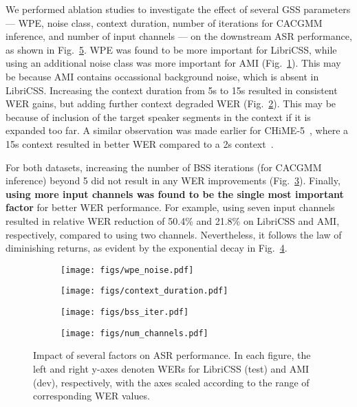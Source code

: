 \documentclass[a4paper]{article}
\begin{document}
We performed ablation studies to investigate the effect of several GSS parameters --- WPE, noise class, context duration, number of iterations for CACGMM inference, and number of input channels --- on the downstream ASR performance, as shown in Fig.~\ref{fig:analysis}. WPE was found to be more important for LibriCSS, while using an additional noise class was more important for AMI (Fig.~\ref{fig:wpe}). This may be because AMI contains occassional background noise, which is absent in LibriCSS. Increasing the context duration from 5s to 15s resulted in consistent WER gains, but adding further context degraded WER (Fig.~\ref{fig:context}). This may be because of inclusion of the target speaker segments in the context if it is expanded too far. A similar observation was made earlier for CHiME-5~\cite{Barker2015TheT}, where a 15s context resulted in better WER compared to a 2s context~\cite{Boeddeker2018FrontendPF}.

For both datasets, increasing the number of BSS iterations (for CACGMM inference) beyond 5 did not result in any WER improvements (Fig.~\ref{fig:iter}). Finally, \textbf{using more input channels was found to be the single most important factor} for better WER performance. For example, using seven input channels resulted in relative WER reduction of 50.4\% and 21.8\% on LibriCSS and AMI, respectively, compared to using two channels. Nevertheless, it follows the law of diminishing returns, as evident by the exponential decay in Fig.~\ref{fig:channels}.

\begin{figure}[t]
\begin{subfigure}{0.49\linewidth}
\centering
\texttt{[image: figs/wpe\_noise.pdf]}
\captionlistentry{}
\label{fig:wpe}
\end{subfigure}
\begin{subfigure}{0.49\linewidth}
\centering
\texttt{[image: figs/context\_duration.pdf]}
\captionlistentry{}
\label{fig:context}
\end{subfigure}\hfill
\begin{subfigure}{0.49\linewidth}
\centering
\texttt{[image: figs/bss\_iter.pdf]}
\captionlistentry{}
\label{fig:iter}
\end{subfigure}
\begin{subfigure}{0.49\linewidth}
\centering
\texttt{[image: figs/num\_channels.pdf]}
\captionlistentry{}
\label{fig:channels}
\end{subfigure}\hfill
\caption{Impact of several factors on ASR performance. In each figure, the left and right y-axes denoten WERs for LibriCSS (test) and AMI (dev), respectively, with the axes scaled according to the range of corresponding WER values.}
\label{fig:analysis}
\end{figure}
\end{document}
